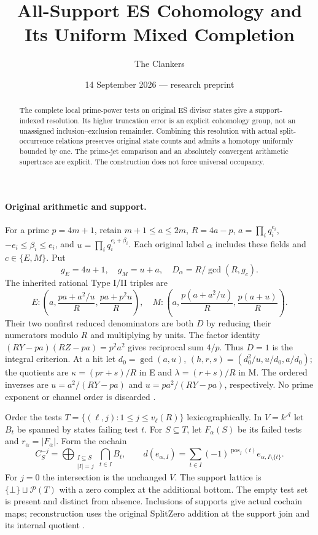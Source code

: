 \documentclass[10pt,a4paper]{article}
\title{All-Support ES Cohomology and Its Uniform Mixed Completion}
\author{The Clankers}
\date{14 September 2026 --- research preprint}
\begin{document}
\maketitle
\begin{abstract}
The complete local prime-power tests on original ES divisor states give a
support-indexed resolution. Its higher truncation error is an explicit
cohomology group, not an unassigned inclusion--exclusion remainder.
Combining this resolution with actual split-occurrence relations preserves
original state counts and admits a homotopy uniformly bounded by one.
The prime-jet comparison and an absolutely convergent arithmetic supertrace
are explicit. The construction does not force universal occupancy.
\end{abstract}

\paragraph{Original arithmetic and support.}
For a prime $p=4m+1$, retain $m+1\le a\le2m$, $R=4a-p$,
$a=\prod_iq_i^{e_i}$, $-e_i\le\beta_i\le e_i$, and
$u=\prod_iq_i^{e_i+\beta_i}$. Each original label $\alpha$ includes these
fields and $c\in\{E,M\}$. Put
\[
 g_E=4u+1,\quad g_M=u+a,\quad D_\alpha=R/\gcd(R,g_c).
\]
The inherited rational Type I/II triples are
\[
 E:\left(a,\frac{pa+a^2/u}R,\frac{pa+p^2u}R\right),\quad
 M:\left(a,\frac{p(a+a^2/u)}R,\frac{p(a+u)}R\right).
\]
Their two nonfirst reduced denominators are both $D$ by reducing their
numerators modulo $R$ and multiplying by units. The factor identity
$(RY-pa)(RZ-pa)=p^2a^2$ gives reciprocal sum $4/p$. Thus $D=1$ is the
integral criterion. At a hit let $d_0=\gcd(a,u)$,
$(h,r,s)=(d_0^2/u,u/d_0,a/d_0)$; the quotients are
$\kappa=(pr+s)/R$ in E and $\lambda=(r+s)/R$ in M.
The ordered inverses are $u=a^2/(RY-pa)$ and $u=pa^2/(RY-pa)$,
respectively. No prime exponent or channel order is discarded \cite{ET}.

Order the tests $T=\{(\ell,j):1\le j\le v_\ell(R)\}$ lexicographically.
In $V=k^{\mathscr A}$ let $B_t$ be spanned by states failing test $t$.
For $S\subseteq T$, let $F_\alpha(S)$ be its failed tests and $r_\alpha=|F_\alpha|$.
Form the cochain
\[
 C_S^{-j}=\bigoplus_{\substack{I\subseteq S\\|I|=j}}\bigcap_{t\in I}B_t,
 \qquad
 d(e_{\alpha,I})=\sum_{t\in I}(-1)^{\operatorname{pos}_I(t)}
                                     e_{\alpha,I\setminus\{t\}}.       \tag{1}
\]
For $j=0$ the intersection is the unchanged $V$. The support lattice is
$\{\bot\}\sqcup\mathcal P(T)$ with a zero complex at the additional bottom.
The empty test set is present and distinct from absence. Inclusions of
supports give actual cochain maps; reconstruction uses the original
SplitZero addition at the support join and its internal quotient \cite{SZ}.
\end{document}
